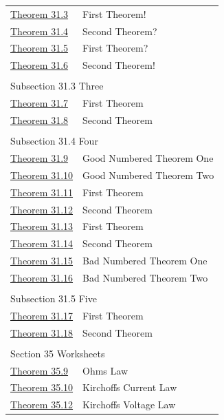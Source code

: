 \documentclass{amsart}
\theoremstyle{plain}%
\theoremstyle{definition}%
\theoremstyle{remark}%
\numberwithin{equation}{section}
\begin{document}
\begin{longtable}[l]{ll}
\hyperref[theorem-number-03]{Theorem 31.3}& First Theorem!\\
\hyperref[theorem-number-04]{Theorem 31.4}& Second Theorem?\\
\hyperref[theorem-number-05]{Theorem 31.5}& First Theorem?\\
\hyperref[theorem-number-06]{Theorem 31.6}& Second Theorem!\\
\multicolumn{2}{l}{\null}\\[1.5ex] \multicolumn{2}{l}{\large Subsection 31.3 Three}\\[0.5ex]
\hyperref[theorem-number-07]{Theorem 31.7}& First Theorem\\
\hyperref[theorem-number-08]{Theorem 31.8}& Second Theorem\\
\multicolumn{2}{l}{\null}\\[1.5ex] \multicolumn{2}{l}{\large Subsection 31.4 Four}\\[0.5ex]
\hyperref[theorem-good-one]{Theorem 31.9}& Good Numbered Theorem One\\
\hyperref[theorem-good-two]{Theorem 31.10}& Good Numbered Theorem Two\\
\hyperref[theorem-number-09]{Theorem 31.11}& First Theorem\\
\hyperref[theorem-number-10]{Theorem 31.12}& Second Theorem\\
\hyperref[theorem-number-11]{Theorem 31.13}& First Theorem\\
\hyperref[theorem-number-12]{Theorem 31.14}& Second Theorem\\
\hyperref[theorem-bad-one]{Theorem 31.15}& Bad Numbered Theorem One\\
\hyperref[theorem-bad-two]{Theorem 31.16}& Bad Numbered Theorem Two\\
\multicolumn{2}{l}{\null}\\[1.5ex] \multicolumn{2}{l}{\large Subsection 31.5 Five}\\[0.5ex]
\hyperref[theorem-number-13]{Theorem 31.17}& First Theorem\\
\hyperref[theorem-number-14]{Theorem 31.18}& Second Theorem\\
\multicolumn{2}{l}{\null}\\[1.5ex] \multicolumn{2}{l}{\large Section 35 Worksheets}\\[0.5ex]
\hyperref[worksheet-networks-2-3]{Theorem 35.9}& Ohms Law\\
\hyperref[worksheet-networks-2-4]{Theorem 35.10}& Kirchoffs Current Law\\
\hyperref[worksheet-networks-2-6]{Theorem 35.12}& Kirchoffs Voltage Law\\

\end{longtable}
\end{document}
